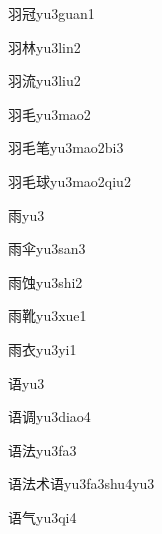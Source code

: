 \begin{verbete}[6;9]{羽冠}{yu3guan1}
\end{verbete}
\begin{verbete}[6;8]{羽林}{yu3lin2}
\end{verbete}
\begin{verbete}[6;10]{羽流}{yu3liu2}
\end{verbete}
\begin{verbete}[6;4]{羽毛}{yu3mao2}
\end{verbete}
\begin{verbete}[6;4;10]{羽毛笔}{yu3mao2bi3}
\end{verbete}
\begin{verbete}[6;4;11]{羽毛球}{yu3mao2qiu2}
\end{verbete}
\begin{verbete}[8]{雨}{yu3}
\end{verbete}
\begin{verbete}[8;6]{雨伞}{yu3san3}
\end{verbete}
\begin{verbete}[8;9]{雨蚀}{yu3shi2}
\end{verbete}
\begin{verbete}[8;13]{雨靴}{yu3xue1}
\end{verbete}
\begin{verbete}[8;6]{雨衣}{yu3yi1}
\end{verbete}
\begin{verbete}[9]{语}{yu3}
\end{verbete}
\begin{verbete}[9;10]{语调}{yu3diao4}
\end{verbete}
\begin{verbete}[9;8]{语法}{yu3fa3}
\end{verbete}
\begin{verbete}[9;8;5;9]{语法术语}{yu3fa3shu4yu3}
\end{verbete}
\begin{verbete}[9;4]{语气}{yu3qi4}
\end{verbete}
